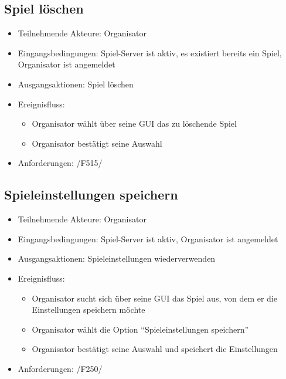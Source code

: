 \documentclass[a4paper]{scrreprt}
\begin{document}
    \subsection{Spiel löschen}
    \begin{itemize}
        \item Teilnehmende Akteure: \Gls{Organisator}
        \item Eingangsbedingungen: \Gls{Spiel-Server} ist aktiv, es existiert bereits ein Spiel, \Gls{Organisator} ist angemeldet
        \item Ausgangsaktionen: \Gls{Spiel} löschen
        \item Ereignisfluss:
        \begin{itemize}
            \item \Gls{Organisator} wählt über seine GUI das zu löschende Spiel
            \item \Gls{Organisator} bestätigt seine Auswahl
        \end{itemize}
        \item Anforderungen: /F515/
    \end{itemize}

    \subsection{Spieleinstellungen speichern}
    \begin{itemize}
        \item Teilnehmende Akteure: \Gls{Organisator}
        \item Eingangsbedingungen: \Gls{Spiel-Server} ist aktiv, \Gls{Organisator} ist angemeldet
        \item Ausgangsaktionen: \Gls{Spieleinstellungen} wiederverwenden
        \item Ereignisfluss:
        \begin{itemize}
            \item \Gls{Organisator} sucht sich über seine GUI das \Gls{Spiel} aus, von dem er die Einstellungen speichern möchte
            \item \Gls{Organisator} wählt die Option \enquote{Spieleinstellungen speichern}
            \item \Gls{Organisator} bestätigt seine Auswahl und speichert die Einstellungen
        \end{itemize}
        \item Anforderungen: /F250/
    \end{itemize}
\end{document}
